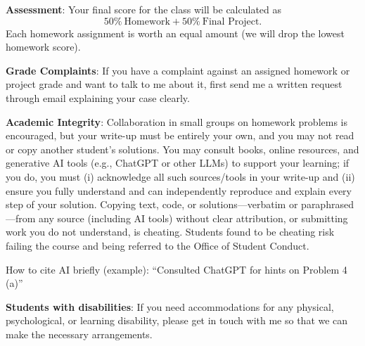 \documentclass[12pt,oneside]{amsart}
\begin{document}
\noindent \textbf{Assessment}: Your final score for the class will be
calculated as
\begin{equation*}
  50 \%~ \text{Homework} + 50 \% ~ 
  \text{Final Project}.  
\end{equation*}
Each homework assignment is worth an equal amount (we will drop the
lowest homework score).  


\noindent \textbf{Grade Complaints}: If you have a complaint
against an assigned homework or project grade and want to talk to me
about it, first send me a written request through email explaining
your case clearly.

\noindent \textbf{Academic Integrity}: Collaboration in small groups
on homework problems is encouraged, but your write-up must be entirely
your own, and you may not read or copy another student’s
solutions. You may consult books, online resources, and generative AI
tools (e.g., ChatGPT or other LLMs) to support your learning; if you
do, you must (i) acknowledge all such sources/tools in your write-up
and (ii) ensure you fully understand and can independently reproduce
and explain every step of your solution. Copying text, code, or
solutions—verbatim or paraphrased—from any source (including AI tools)
without clear attribution, or submitting work you do not understand,
is cheating. Students found to be cheating risk failing the course and
being referred to the Office of Student Conduct. 

How to cite AI briefly (example): “Consulted ChatGPT for hints
on Problem 4 (a)” 

\noindent \textbf{Students with disabilities}: If you need
accommodations for any physical, psychological, or learning
disability, please get in touch with me so that we can make the
necessary arrangements. 
\end{document}
